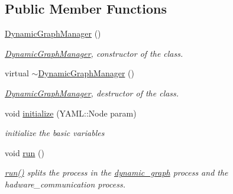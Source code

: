 \subsection*{Public Member Functions}
\begin{DoxyCompactItemize}
\item 
\mbox{\label{classdynamic__graph_1_1DynamicGraphManager_afd98424082e5a1f878e6c7cb08a62c4a}} 
\hyperlink{classdynamic__graph_1_1DynamicGraphManager_afd98424082e5a1f878e6c7cb08a62c4a}{Dynamic\+Graph\+Manager} ()
\begin{DoxyCompactList}\small\item\em \hyperlink{classdynamic__graph_1_1DynamicGraphManager}{Dynamic\+Graph\+Manager}, constructor of the class. \end{DoxyCompactList}\item 
\mbox{\label{classdynamic__graph_1_1DynamicGraphManager_a6bcf93d16574035ee654289274d0a790}} 
virtual \hyperlink{classdynamic__graph_1_1DynamicGraphManager_a6bcf93d16574035ee654289274d0a790}{$\sim$\+Dynamic\+Graph\+Manager} ()
\begin{DoxyCompactList}\small\item\em \hyperlink{classdynamic__graph_1_1DynamicGraphManager}{Dynamic\+Graph\+Manager}, destructor of the class. \end{DoxyCompactList}\item 
\mbox{\label{classdynamic__graph_1_1DynamicGraphManager_ac6859456bbdd4307cb880dc5e54131dd}} 
void \hyperlink{classdynamic__graph_1_1DynamicGraphManager_ac6859456bbdd4307cb880dc5e54131dd}{initialize} (Y\+A\+M\+L\+::\+Node param)
\begin{DoxyCompactList}\small\item\em initialize the basic variables \end{DoxyCompactList}\item 
void \hyperlink{classdynamic__graph_1_1DynamicGraphManager_a93272fcbb3793dfc92422186022ecf72}{run} ()
\begin{DoxyCompactList}\small\item\em \hyperlink{classdynamic__graph_1_1DynamicGraphManager_a93272fcbb3793dfc92422186022ecf72}{run()} splits the process in the \hyperlink{namespacedynamic__graph}{dynamic\+\_\+graph} process and the hadware\+\_\+communication process. \end{DoxyCompactList}\item 

\end{DoxyCompactItemize}
